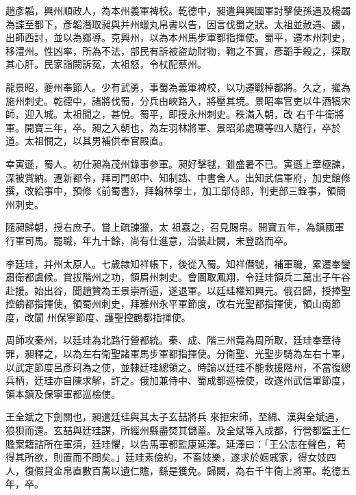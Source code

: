 \begin{pinyinscope}
 趙彥韜，興州順政人，為本州義軍裨校。乾德中，昶遣與興國軍討擊使孫遇及楊蠲為諜至都下，彥韜潛取昶與并州蠟丸帛書以告，因言伐蜀之狀。太祖並赦遇、蠲，
 出師西討，並以為鄉導。克興州，以為本州馬步軍都指揮使。蜀平，遷本州刺史，移澧州。性凶率，所為不法，部民有訴被盜劫財物，鞫之不實，彥韜手殺之，探取其心肝。民家詣闕訴冤，太祖怒，令杖配蔡州。



 龍景昭，夔州奉節人。少有武勇，事蜀為義軍裨校，以功遷戰棹都將。久之，擢為施州刺史。乾德中，諸將伐蜀，分兵由峽路入，將壓其境。景昭率官吏以牛酒犒宋師，迎入城。太祖聞之，甚悅。蜀平，即授永州刺史。秩滿入朝，改
 右千牛衛將軍。開寶三年，卒。昶之入朝也，為左羽林將軍、景昭弟處瑭等四人隨行，卒於道。太祖憫之，以其男補供奉官殿直。



 幸寅遜，蜀人。初仕昶為茂州錄事參軍。昶好擊毬，雖盛暑不已。寅遜上章極諫，深被賞納。遷新都令，拜司門郎中、知制誥、中書舍人。出知武信軍府，加史館修撰，改給事中，預修《前蜀書》，拜翰林學士，加工部侍郎，判吏部三銓事，領簡州刺史。



 隨昶歸朝，授右庶子。嘗上疏諫獵，太
 祖嘉之，召見賜帛。開寶五年，為鎮國軍行軍司馬。罷職，年九十餘，尚有仕進意，治裝赴闕，未登路而卒。



 李廷珪，并州太原人。七歲隸知祥帳下，後從入蜀。知祥僭號，補軍職，累遷奉鑾肅衛都虞候。賞拔階州之功，領眉州刺史。會圖取鳳翔，令廷珪領兵二萬出子午谷赴援。始出谷，聞趙贊為王景崇所逼，遂退軍。以廷珪權知興元。俄召歸，授捧聖控鶴都指揮使，領蜀州刺史，拜雅州永平軍節度，改右光聖都指揮使，領山南節度，改閬
 州保寧節度、護聖控鶴都指揮使。



 周師攻秦州，以廷珪為北路行營都統。秦、成、階三州竟為周所取，廷珪奉章待罪，昶釋之，以為左右衛聖諸軍馬步軍都指揮使。分衛聖、光聖步騎為左右十軍，以武定節度呂彥珂為之使，並隸廷珪總領之。時論以廷珪不能救援階州，不當復總兵柄，廷珪亦自陳求解，許之。俄加兼侍中、蜀成都巡檢使，改遂州武信軍節度，領本鎮及保寧軍都巡檢使。



 王全斌之下劍關也，昶遣廷珪與其太子玄喆將兵
 來拒宋師，至綿、漢與全斌遇，狼狽而還。玄喆與廷珪謀，所經州縣盡焚其儲蓄。及全斌等入成都，行營都監王仁贍案籍詰所在軍須，廷珪懼，以告馬軍都監康延澤。延澤曰：「王公志在聲色，苟得其所欲，則置而不問矣。」廷珪素儉約，不畜妓樂，遂求於姻戚家，得女妓四人，復假貸金帛直數百萬以遺仁贍，繇是獲免。歸闕，為右千牛衛上將軍。乾德五年，卒。




\end{pinyinscope}
